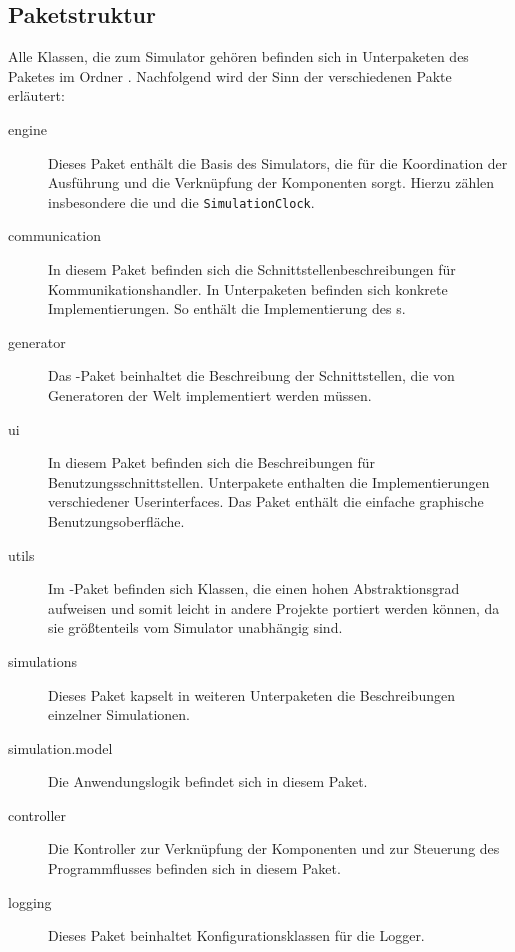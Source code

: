 \subsection{Paketstruktur}
Alle Klassen, die zum Simulator gehören befinden sich in Unterpaketen des Paketes  im Ordner .
Nachfolgend wird der Sinn der verschiedenen Pakte erläutert:
\begin{description}
	\item[engine] Dieses Paket enthält die Basis des Simulators, die für die Koordination der Ausführung und die Verknüpfung der Komponenten sorgt. Hierzu zählen insbesondere die  und die \texttt{SimulationClock}.
	\item[communication] In diesem Paket befinden sich die Schnittstellenbeschreibungen für Kommunikationshandler. In Unterpaketen befinden sich konkrete Implementierungen. So enthält  die Implementierung des s.
	\item[generator] Das -Paket beinhaltet die Beschreibung der Schnittstellen, die von Generatoren der Welt implementiert werden müssen.
	\item[ui] In diesem Paket befinden sich die Beschreibungen für Benutzungsschnittstellen. Unterpakete enthalten die Implementierungen verschiedener Userinterfaces. Das Paket  enthält die einfache graphische Benutzungsoberfläche.
	\item[utils] Im -Paket befinden sich Klassen, die einen hohen Abstraktionsgrad aufweisen und somit leicht in andere Projekte portiert werden können, da sie größtenteils vom Simulator unabhängig sind.
	\item[simulations] Dieses Paket kapselt in weiteren Unterpaketen die Beschreibungen einzelner Simulationen.
	\item[simulation.model] Die Anwendungslogik befindet sich in diesem Paket.
	\item[controller] Die Kontroller zur Verknüpfung der Komponenten und zur Steuerung des Programmflusses befinden sich in diesem Paket.
	\item[logging] Dieses Paket beinhaltet Konfigurationsklassen für die Logger.
\end{description}
